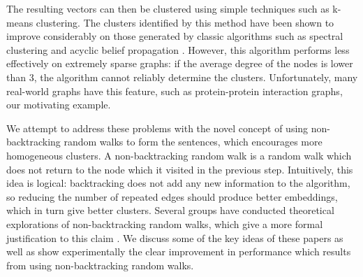 \documentclass{article} %
\begin{document}
The resulting vectors can then be clustered using simple techniques such as k-means clustering. The clusters identified by this method have been shown to improve considerably on those generated by classic algorithms such as spectral clustering and acyclic belief propagation \cite{NodeEmbed}. However, this algorithm performs less effectively on extremely sparse graphs: if the average degree of the nodes is lower than 3, the algorithm cannot reliably determine the clusters. Unfortunately, many real-world graphs have this feature, such as protein-protein interaction graphs, our motivating example.

We attempt to address these problems with the novel concept of using non-backtracking random walks to form the sentences, which encourages more homogeneous clusters. A non-backtracking random walk is a random walk which does not return to the node which it visited in the previous step. Intuitively, this idea is logical: backtracking does not add any new information to the algorithm, so reducing the number of repeated edges should produce better embeddings, which in turn give better clusters. Several groups have conducted theoretical explorations of non-backtracking random walks, which give a more formal justification to this claim \cite{Redemption, Alon, NBT-Ihara}. We discuss some of the key ideas of these papers as well as show experimentally the clear improvement in performance which results from using non-backtracking random walks.




\end{document}
